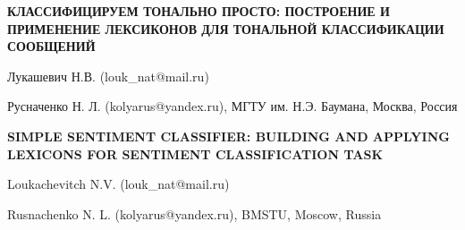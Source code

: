 \documentclass[a4paper,11pt]{extarticle}
\begin{document}
    \newcommand\twitter{{\it Twitter }}

    \begin{center}
        \bf
        КЛАССИФИЦИРУЕМ ТОНАЛЬНО ПРОСТО: ПОСТРОЕНИЕ И ПРИМЕНЕНИЕ ЛЕКСИКОНОВ ДЛЯ
        ТОНАЛЬНОЙ КЛАССИФИКАЦИИ СООБЩЕНИЙ
    \end{center}
    \begin{center}
        Лукашевич Н.В. (louk\_nat@mail.ru)

        Русначенко Н. Л. (kolyarus@yandex.ru),
        МГТУ им. Н.Э. Баумана, Москва, Россия
    \end{center}
    \begin{center}
        \bf
        SIMPLE SENTIMENT CLASSIFIER: BUILDING AND APPLYING LEXICONS FOR SENTIMENT
        CLASSIFICATION TASK
    \end{center}
    \begin{center}
        Loukachevitch N.V. (louk\_nat@mail.ru)

        Rusnachenko N. L. (kolyarus@yandex.ru), BMSTU, Moscow, Russia
    \end{center}


    

    

    

    

    

    

    

    \clearpage
    \newpage
\end{document}
